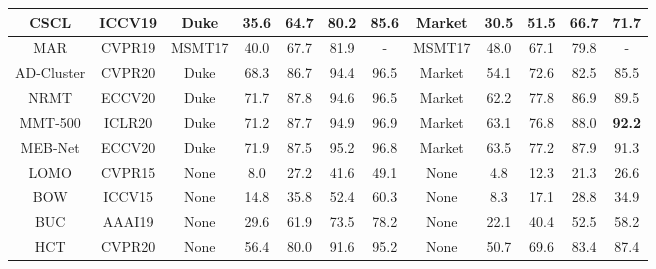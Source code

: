\documentclass[final]{cvpr}
\begin{document}
\begin{table*}
\begin{center}
{\begin{tabular}{c|c|ccccc|ccccc}
			CSCL \cite{wu2019unsupervised} & ICCV19      & Duke                             & 35.6                              & 64.7          & 80.2          & 85.6          & Market & 30.5          & 51.5          & 66.7          & 71.7          \\ \hline
			MAR \cite{yu2019unsupervised} & CVPR19      & MSMT17                           & 40.0                              & 67.7          & 81.9          & -             & MSMT17 & 48.0          & 67.1          & 79.8          & -             \\
AD-Cluster \cite{zhai2020ad} & CVPR20     & Duke                             & 68.3                              & 86.7          & 94.4          & 96.5          & Market & 54.1          & 72.6          & 82.5          & 85.5          \\
			NRMT \cite{zhao2020unsupervised} & ECCV20    & Duke                             & 71.7                              & 87.8          & 94.6          & 96.5          & Market & 62.2          & 77.8          & 86.9          & 89.5          \\
			MMT-500 \cite{MMT} &  ICLR20                & Duke                             & 71.2                              & 87.7          & 94.9          & 96.9          & Market & 63.1          & 76.8          & 88.0          & \textbf{92.2}          \\
			MEB-Net \cite{zhai2020multiple} & ECCV20     & Duke                             & 71.9                & 87.5 & 95.2 & 96.8 & Market & 63.5 & 77.2          & 87.9          & 91.3 \\ \hline
			LOMO \cite{LOMO}& CVPR15                    & None                             & 8.0                               & 27.2          & 41.6          & 49.1          & None   & 4.8           & 12.3          & 21.3          & 26.6          \\
			BOW \cite{market1501}& ICCV15                      & None                             & 14.8                              & 35.8          & 52.4          & 60.3          & None   & 8.3           & 17.1          & 28.8          & 34.9          \\
			BUC \cite{lin2019bottom} & AAAI19            & None                             & 29.6                              & 61.9          & 73.5          & 78.2          & None   & 22.1          & 40.4          & 52.5          & 58.2          \\
			HCT \cite{zeng2020hierarchical} & CVPR20    & None                             & 56.4                              & 80.0          & 91.6          & 95.2          & None   & 50.7          & 69.6          & 83.4          & 87.4          \\

\end{tabular}}
\end{center}
\end{table*}
\end{document}
